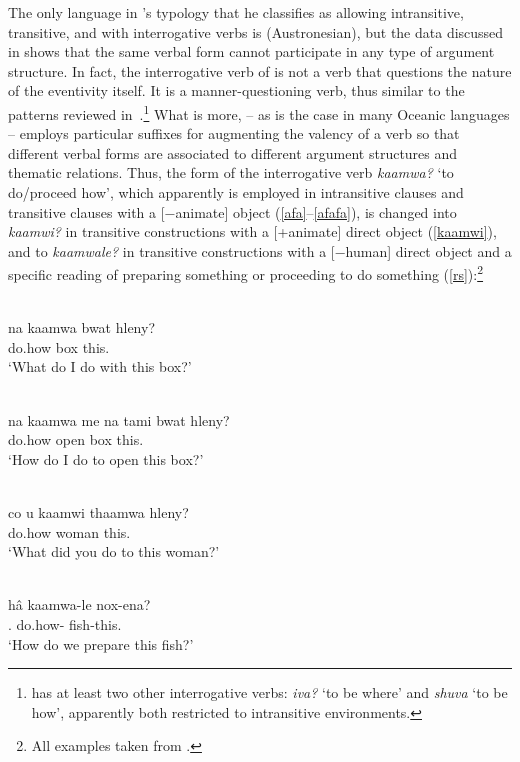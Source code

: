 \documentclass[output=paper]{langsci/langscibook}
\begin{document}
The only language in \citet{hagege2008}'s typology that he classifies as
allowing intransitive, transitive, and  with
interrogative verbs is  (Austronesian), but the data discussed
in \citet{bril2002,bril2004} shows that the same verbal form cannot participate
in any type of argument structure. In fact, the interrogative verb of
 is not a verb that questions the nature of the eventivity
itself. It is a manner-questioning verb, thus similar to the patterns reviewed
in~.\footnote{ has at least two other
interrogative verbs: \emph{iva?} `to be where' and \emph{shuva} `to be how',
apparently both restricted to intransitive environments.} What is more,
 -- as is the case in many Oceanic languages -- employs
particular suffixes for augmenting the valency of a verb so that different
verbal forms are associated to different argument structures and thematic
relations. Thus, the form of the interrogative verb \emph{kaamwa?} `to
do/proceed how', which apparently is employed in intransitive clauses and
transitive clauses with a [−animate] object (\ref{afa}--\ref{afafa}), is
changed into \emph{kaamwi?} in transitive constructions with a [+animate]
direct object (\ref{kaamwi}), and to \emph{kaamwale?} in transitive
constructions with a [−human] direct object and a specific reading of preparing
something or proceeding to do something (\ref{rs}):\footnote{All examples
taken from \citet[50]{bril2002}.}

\begin{exe}
    \ex \label{afa} \\
\gll na kaamwa	bwat hleny? \\
\Fsg{} do.how box this.\Dei{}\\
\glt `What do I do with this box?'

\ex \label{afafa} \\
\gll na kaamwa	me	na tami bwat hleny?\\
\Fsg{} do.how \Depend{}	\Fsg{} open box this.\Dei{}\\
\glt `How do I do to open this box?'

\ex \label{kaamwi}\\
\gll    co u kaamwi thaamwa hleny?\\
            \Ssg{} \Acc{} do.how woman	this.\Dei{}\\
\glt `What did you do to this woman?'

\ex \label{rs}\\
\gll h\^{a}	kaamwa-le	nox-ena?\\
\Fpl.\Incl{} do.how-\Tr{} fish-this.\Dei{}\\
\glt `How do we prepare this fish?'
\end{exe}
\end{document}

